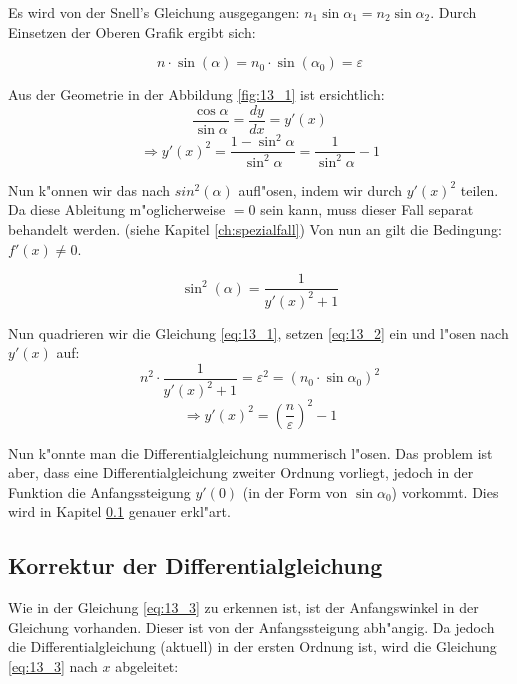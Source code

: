 Es wird von der Snell's Gleichung ausgegangen: $n_1 \sin \alpha_1 = n_2 \sin \alpha_2$.
Durch Einsetzen der Oberen Grafik ergibt sich:

\begin{equation} \label{eq:13_1}
  n \cdot \sin(\alpha) = n_0 \cdot \sin(\alpha_0) = \varepsilon
\end{equation}

Aus der Geometrie in der Abbildung \ref{fig:13_1} ist ersichtlich:
$$\frac{\cos \alpha}{\sin \alpha} = \frac{dy}{dx} = y'(x)$$
$$\Rightarrow y'(x)^2 = \frac{1 - \sin^2 \alpha}{\sin^2 \alpha} = \frac{1}{\sin^2
\alpha} - 1$$

Nun k"onnen wir das nach $sin^2(\alpha)$ aufl"osen, indem wir durch $y'(x)^2$ teilen. Da
diese Ableitung m"oglicherweise $=0$ sein kann, muss dieser Fall separat behandelt werden.
(siehe Kapitel \ref{ch:spezialfall}) Von nun an gilt die Bedingung: $f'(x) \neq 0$.

\begin{equation} \label{eq:13_2}
\sin^2 (\alpha) = \frac{1}{y'(x)^2 + 1}
\end{equation}

Nun quadrieren wir die Gleichung \ref{eq:13_1}, setzen \ref{eq:13_2} ein und l"osen
nach $y'(x)$ auf:
\begin{equation} \label{eq:13_3}
n^2 \cdot \frac{1}{y'(x)^2 + 1} = \varepsilon^2 = (n_0 \cdot \sin \alpha_0)^2
\end{equation}
\begin{equation} \label{eq:13_4}
\Rightarrow y'(x)^2 = \left( \frac{n}{\varepsilon} \right)^2 - 1
\end{equation}

Nun k"onnte man die Differentialgleichung nummerisch l"osen. Das problem ist aber, dass 
eine Differentialgleichung zweiter Ordnung vorliegt, jedoch in der Funktion die
Anfangssteigung $y'(0)$ (in der Form von $\sin \alpha_0$) vorkommt. Dies wird in Kapitel
\ref{ch:korrektur} genauer erkl"art.

\subsection{Korrektur der Differentialgleichung} \label{ch:korrektur}

Wie in der Gleichung \ref{eq:13_3} zu erkennen ist, ist der Anfangswinkel in der
Gleichung vorhanden. Dieser ist von der Anfangssteigung abh"angig. Da jedoch die
Differentialgleichung (aktuell) in der ersten Ordnung ist, wird die Gleichung
\ref{eq:13_3} nach $x$ abgeleitet:

